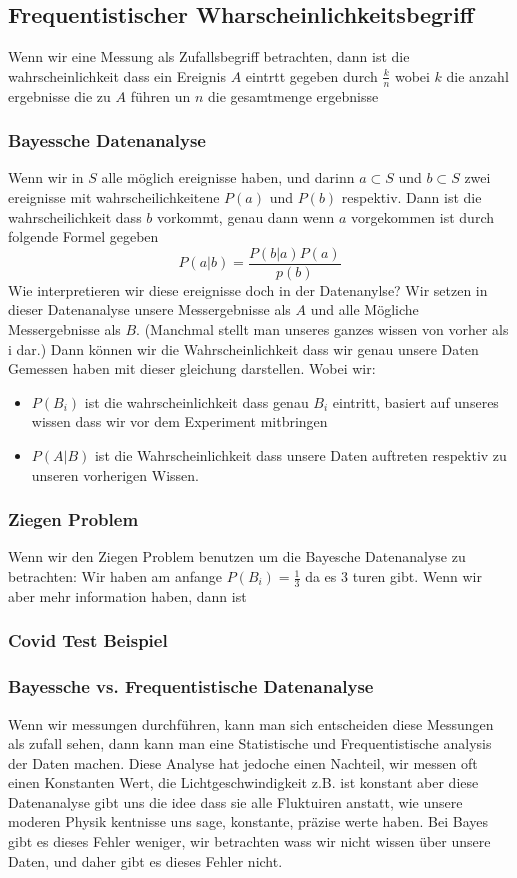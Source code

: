\documentclass{article}
\begin{document}
\subsection*{Frequentistischer Wharscheinlichkeitsbegriff}
Wenn wir eine Messung als Zufallsbegriff betrachten, dann ist die wahrscheinlichkeit dass ein Ereignis $A$ eintrtt gegeben durch $\frac{k}{n}$ wobei $k$ die anzahl ergebnisse die zu $A$ führen un $n$ die gesamtmenge ergebnisse
\subsubsection*{Bayessche Datenanalyse}
Wenn wir in $S$ alle möglich ereignisse haben, und darinn $a\subset S$ und $b\subset S$ zwei ereignisse mit wahrscheilichkeitene $P(a)$ und $P(b)$ respektiv. Dann ist die wahrscheilichkeit dass $b$ vorkommt, genau dann wenn $a$ vorgekommen ist durch folgende Formel gegeben
\[P(a|b)=\frac{P(b|a)P(a)}{p(b)}\]
Wie interpretieren wir diese ereignisse doch in der Datenanylse? Wir setzen in dieser Datenanalyse unsere Messergebnisse als $A$ und alle Mögliche Messergebnisse als $B$. (Manchmal stellt man unseres ganzes wissen von vorher als i dar.) Dann können wir die Wahrscheinlichkeit dass wir genau unsere Daten Gemessen haben mit dieser gleichung darstellen.
Wobei wir:\begin{itemize}
  \item{$P(B_i)$ ist die wahrscheinlichkeit dass genau $B_i$ eintritt, basiert auf unseres wissen dass wir vor dem Experiment mitbringen}
  \item{$P(A|B)$ ist die Wahrscheinlichkeit dass unsere Daten auftreten respektiv zu unseren vorherigen Wissen.}
\end{itemize}
\subsubsection*{Ziegen Problem}
Wenn wir den Ziegen Problem benutzen um die Bayesche Datenanalyse zu betrachten:
Wir haben am anfange $P(B_i)=\frac{1}{3}$ da es $3$ turen gibt. Wenn wir aber mehr information haben, dann ist 


\subsubsection*{Covid Test Beispiel}

\subsubsection*{Bayessche vs. Frequentistische Datenanalyse} Wenn wir messungen durchführen, kann man sich entscheiden diese Messungen als zufall sehen, dann kann man eine Statistische und Frequentistische analysis der Daten machen.
Diese Analyse hat jedoche einen Nachteil, wir messen oft einen Konstanten Wert, die Lichtgeschwindigkeit z.B. ist konstant aber diese Datenanalyse gibt uns die idee dass sie alle Fluktuiren anstatt, wie unsere moderen Physik kentnisse uns sage, konstante, präzise werte haben.
Bei Bayes gibt es dieses Fehler weniger, wir betrachten wass wir nicht wissen über unsere Daten, und daher gibt es dieses Fehler nicht.
\end{document}
